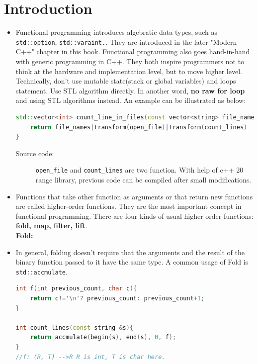 \documentclass[a4paper,11pt,twoside]{book}
\begin{document}
\section{Introduction}
\begin{itemize}
	\item  Functional programming introduces algebratic data types, such as \texttt{std::option}, \texttt{std::varaint.}. They are introduced in the later "Modern C++" chapter in this book. Functional programming also goes hand-in-hand with generic programming in C++. They both inspire programmers not to think at the hardware and implementation level, but to move higher level. Technically, don't use mutable state(stack or global variables) and loops statement. Use STL algorithm directly. In another word,  \textbf{no raw for loop} and using STL algorithms instead. An example can be illustrated as below:
	
	
\begin{lstlisting}[frame=single, language=c++]
std::vector<int> count_line_in_files(const vector<string> file_names){
	return file_names|transform(open_file)|transform(count_lines)
}
\end{lstlisting}	

\begin{description}
	\item[Source code:] \texttt{open\_file} and \texttt{count\_lines} are two function. With help of c++ 20 range library, previous code can be compiled after small modifications.  
\end{description}
		
	\item Functions that take other function as arguments or that return new functions are called higher-order functions. They are the most important concept in functional programming. There are four kinds of usual higher order functions: \textbf{fold, map, filter, lift}. 
	\\
\textbf{Fold:}

	
	\item In general, folding doesn't require that the arguments and the result of the binary function passed to it have the same type. A common usage of Fold is \texttt{std::accmulate}.
	
\begin{lstlisting}[frame=single, language=c++]
int f(int previous_count, char c){
   	return c!='\n'? previous_count: previous_count+1;
}
   
int count_lines(const string &s){
   	return accmulate(begin(s), end(s), 0, f);
}
//f: (R, T) -->R R is int, T is char here.
\end{lstlisting} 
	

\end{itemize}
\end{document}
